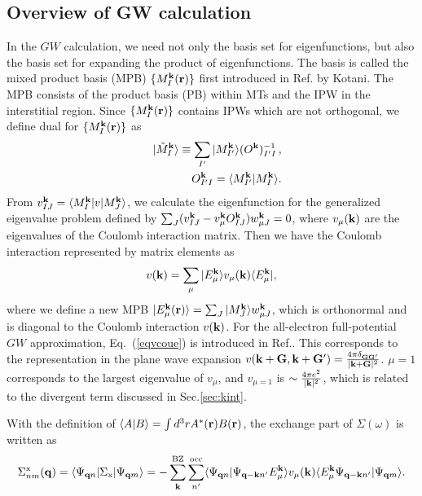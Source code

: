 \documentclass[a4paper,10pt,epsf,fleqn]{article}
\def\Psiqn{{\Psi_{{\bf q}n}}}
\def\Psiqm{{\Psi_{{\bf q}m}}}
\def\Psiqn{{\Psi_{{\bf q}n}}}
\newcommand{\bfq}{{\bf q}}
\newcommand{\bfk}{{\bf k}}
\newcommand{\bfr}{{\bf r}}
\newcommand{\bfG}{{\bf G}}
\newcommand{\req}[1]{\mbox{Eq.~(\ref{#1})}}
\begin{document}
\subsection{Overview of GW calculation}
In the $GW$ calculation, we need not only the basis set for
eigenfunctions, but also the basis set for expanding the product of eigenfunctions.
The basis is called the mixed product basis (MPB) $\{M^{\bf k}_I({\bf r}) \}$ first introduced in Ref.\cite{kotani_all-electron_2002} by Kotani. The MPB consists of the product basis (PB) within MTs \cite{aryasetiawan_product-basis_1994}
and the IPW in the interstitial region.
Since $\{M^{\bf k}_I({\bf r}) \}$ contains IPWs which are not orthogonal,
we define dual for $\{M^{\bf k}_I({\bf r}) \}$ as
\begin{eqnarray}
&& |\tilde{M}^{\bf k}_{I} \rangle \equiv \sum_{I'}
   |M^{\bf k}_{I'} \rangle (O^{\bf k})^{-1}_{I'I} \, , \\
&& O^{\bf k}_{I'I} = \langle M^{\bf k}_{I'} |  M^{\bf k}_I \rangle.
\label{eq:ovlmpb}
\end{eqnarray}
From $v_{IJ}^\bfk= \langle M^{\bf k}_{I} |v|  M^{\bf k}_J \rangle$,  
we calculate the eigenfunction for the generalized eigenvalue problem defined by
$\sum_J (v_{IJ}^\bfk - v^\bfk_\mu O^{\bfk}_{IJ} ) w_{\mu J}^\bfk = 0$, where
$v_\mu(\bfk)$ are the eigenvalues of the Coulomb interaction matrix.
Then we have the Coulomb interaction represented by matrix elements as 
\begin{eqnarray}
v(\bfk)=\sum_{\mu} | E^{\bfk}_\mu \rangle {v_\mu(\bfk)} 
\langle E^{\bfk}_\mu |,
\label{eqvcoue}
\end{eqnarray}
where we define a new MPB 
$|E^{\bf k}_\mu({\bf r})\rangle=\sum_J |M^\bfk_J\rangle w^\bfk_{\mu J}$,
which is orthonormal and is diagonal to the Coulomb interaction $v(\bfk)$. 
For the all-electron full-potential $GW$ approximation,
\req{eqvcoue} is introduced in Ref.\cite{friedrich_efficient_2010}.
This corresponds to the representation in the plane wave expansion 
$v(\bfk+\bfG,\bfk+\bfG')=\frac{4 \pi \delta_{\bfG \bfG'}}{|\bfk+\bfG|^2}$.
$\mu=1$ corresponds to the largest eigenvalue of $v_{\mu}$, and 
$v_{\mu=1}$ is $\sim \frac{4 \pi e^2}{|\bfk|^2}$, which is related to 
the divergent term discussed in Sec.\ref{sec:kint}.

With the definition of 
$\langle A| B\rangle =\int d^3r A^*(\bfr) B(\bfr)$,
the exchange part of $\Sigma(\omega)$ is written as
\begin{eqnarray}
\Sigma^{\rm x}_{nm}(\bfq)=
\langle \Psiqn|\Sigma_{\rm x} |\Psiqm \rangle
=-\sum^{\rm BZ}_{{\bf k}}  \sum^{\rm  occ}_{n'}
\langle \Psiqn| \Psi_{{\bf q-k}n'} E_\mu^{\bf k} \rangle
v_{\mu}({\bf k})
\langle E_\mu^\bfk \Psi_{{\bf q-k}n'} | \Psiqm \rangle.
\label{eq:sigx}
\end{eqnarray}
\end{document}
